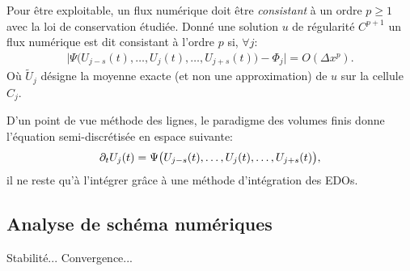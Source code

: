 \begin{definition}
    Pour être exploitable, un flux numérique doit être \textit{consistant} à un ordre $p\geq 1$ avec la loi de conservation étudiée.
    Donné une solution $u$ de régularité $C^{p+1}$ un flux numérique est dit consistant à l'ordre $p$ si, $\forall j$:
    \begin{align}
        \vert \Psi \bigl( U_{j-s}(t) , \ldots , U_j(t), \ldots ,  U_{j+s}(t)\bigr) -  \Phi_j \vert = O(\Delta x^p).
    \end{align}
    Où $\tilde U_j$ désigne la moyenne exacte (et non une approximation) de $u$ sur la cellule $C_j$.
\end{definition}
D'un point de vue méthode des lignes, le paradigme des volumes finis donne l'équation semi-discrétisée en espace suivante:
\begin{align}
    \partial_t U_j(t) = \Psi \bigl( U_{j-s}(t) , \ldots , U_j(t), \ldots ,  U_{j+s}(t)\bigr),
\end{align}
il ne reste qu'à l'intégrer grâce à une méthode d'intégration des EDOs.


\subsection{Analyse de schéma numériques}
Stabilité... Convergence...
\begin{definition}
\end{definition}
\begin{definition}
\end{definition}